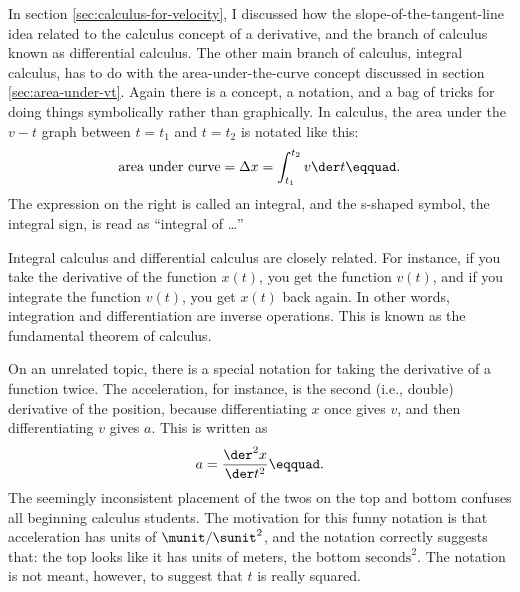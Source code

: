In section \ref{sec:calculus-for-velocity}, I discussed how the slope-of-the-tangent-line
idea related to the calculus concept of a derivative, and
the branch of calculus known as differential calculus. The
other main branch of calculus, integral
calculus, has to do with the area-under-the-curve concept
discussed in section \ref{sec:area-under-vt}. Again there is a
concept, a notation, and a bag of tricks for doing things
symbolically rather than graphically. In calculus, the area
under the $v-t$ graph between $t=t_1$ and $t=t_2$ is notated like this:
\begin{equation*}
  \text{area under curve} = \Delta x = \int_{t_1}^{t_2}v \der t\eqquad.
\end{equation*}
The expression on the right is called an integral, and the
s-shaped symbol, the integral sign, is read as ``integral of \ldots''

Integral calculus and differential calculus are closely
related. For instance, if you take the derivative of the
function $x(t)$, you get the function $v(t)$, and if you
integrate the function $v(t)$, you get $x(t)$ back again. In
other words, integration and differentiation are inverse
operations. This is known as the fundamental theorem of
calculus.

On an unrelated topic, there is a special notation for
taking the derivative of a function twice. The acceleration,
for instance, is the second (i.e., double) derivative
of the position, because differentiating $x$ once gives $v$,
and then differentiating $v$ gives $a$. This is written as
\begin{equation*}
   a = \frac{\der^2 x}{\der t^2}\eqquad.
\end{equation*}
The seemingly inconsistent placement of the twos on the top
and bottom confuses all beginning calculus students. The
motivation for this funny notation is that acceleration has
units of $\munit/\sunit^2$, and the notation correctly suggests that:
the top looks like it has units of meters, the bottom
$\text{seconds}^2$. The notation is not meant, however, to suggest
that $t$ is really squared.

